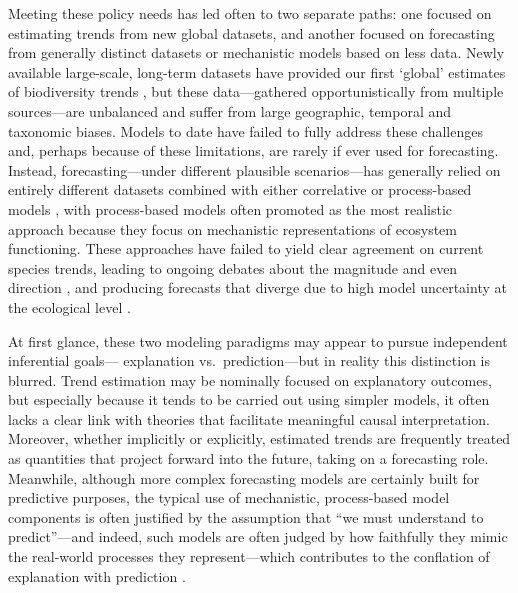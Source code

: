 \documentclass[11pt]{article}
\newcommand{\llabel}[1]{\hypertarget{lintarget:#1}{}\linelabel{lin:#1}}
\begin{document}
Meeting these policy needs has led often to two separate paths: one focused on estimating trends from new global datasets, and another focused on forecasting from generally distinct datasets or mechanistic models based on less data. 
Newly available large-scale, long-term datasets have provided our first `global' estimates of biodiversity trends \citep[e.g.][]{loh2005living,Dornelas2018}, but these data---gathered opportunistically from multiple sources---are unbalanced and suffer from large geographic, temporal and taxonomic biases. Models to date have failed to fully address these challenges and, perhaps because of these limitations, are rarely if ever used for forecasting.
Instead, forecasting---under different plausible scenarios---has generally relied on entirely different datasets combined with either correlative or process-based models \citep{IPBES2019}, with process-based models often promoted as the most realistic approach \citep{Urban2016, Pilowsky2022} because they focus on mechanistic representations of ecosystem functioning. These approaches have failed to yield clear agreement on current species trends, leading to ongoing debates about the magnitude and even direction \citep{Dornelas2014, Leung2020, Buschke2021, Johnson2024}, and producing forecasts that diverge due to high model uncertainty at the ecological level \citep{Cheaib2012, Thuiller2019}.

\llabel{inferentialgoal}At first glance, these two modeling paradigms may appear to pursue independent inferential goals--- explanation vs.\ prediction---but in reality this distinction is blurred. Trend estimation may be nominally focused on explanatory outcomes, but especially because it tends to be carried out using simpler models, it often lacks a clear link with theories that facilitate meaningful causal interpretation. Moreover, whether implicitly or explicitly, estimated trends are frequently treated as quantities that project forward into the future, taking on a forecasting role. Meanwhile, although more complex forecasting models are certainly built for predictive purposes, the typical use of mechanistic, process-based model components is often justified by the assumption that ``we must understand to predict”---and indeed, such models are often judged by how faithfully they mimic the real-world processes they represent---which contributes to the conflation of explanation with prediction \citep{Shmueli2010}.
\end{document}
